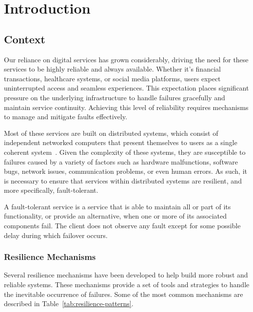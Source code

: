 \chapter{Introduction}\label{ch:introduction}


\section{Context}\label{sec:context}

Our reliance on digital services has grown considerably,
driving the need for these services to be highly reliable and always available.
Whether it's financial transactions, healthcare systems, or social media platforms, users expect uninterrupted access and seamless experiences.
This expectation places significant pressure on the underlying infrastructure to handle failures gracefully and maintain service continuity.
Achieving this level of reliability requires mechanisms to manage and mitigate faults effectively.

Most of these services are built on distributed systems,
which consist of independent networked computers that present themselves to users as a single coherent system~\cite{fcc-distributed-systems}.
Given the complexity of these systems, they are susceptible to failures caused by a variety of factors such as hardware malfunctions, software bugs, network issues, communication problems, or even human errors.
As such, it is necessary to ensure that services within distributed systems are resilient, and more specifically, fault-tolerant.

A fault-tolerant service is a service that is able to maintain all or part of its functionality,
or provide an alternative, when one or more of its associated components fail.
The client does not observe any fault except for some possible delay during which failover occurs.

\subsection{Resilience Mechanisms}\label{subsec:resilience-mechanisms}

Several resilience mechanisms have been developed to help build more robust and reliable systems.
These mechanisms provide a set of tools and strategies to handle the inevitable occurrence of failures.
Some of the most common mechanisms are described in Table~\ref{tab:resilience-patterns}.

